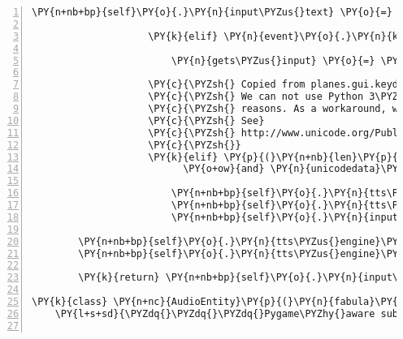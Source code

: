 \begin{Verbatim}[commandchars=\\\{\},numbers=left,firstnumber=1,stepnumber=1]
                        \PY{n+nb+bp}{self}\PY{o}{.}\PY{n}{input\PYZus{}text} \PY{o}{=} \PY{n+nb+bp}{self}\PY{o}{.}\PY{n}{input\PYZus{}text}\PY{p}{[}\PY{l+m+mi}{0}\PY{p}{:}\PY{o}{\PYZhy{}}\PY{l+m+mi}{1}\PY{p}{]}

                    \PY{k}{elif} \PY{n}{event}\PY{o}{.}\PY{n}{key} \PY{o+ow}{in} \PY{n}{ENTER\PYZus{}KEYS}\PY{p}{:}

                        \PY{n}{gets\PYZus{}input} \PY{o}{=} \PY{n+nb+bp}{False}

                    \PY{c}{\PYZsh{} Copied from planes.gui.keydown(self, keydown\PYZus{}event)}
                    \PY{c}{\PYZsh{} We can not use Python 3\PYZsq{}s str.isprintable() for Python 2 compatibility}
                    \PY{c}{\PYZsh{} reasons. As a workaround, we check the Unicode category of the input.}
                    \PY{c}{\PYZsh{} See}
                    \PY{c}{\PYZsh{} http://www.unicode.org/Public/5.1.0/ucd/UCD.html\PYZsh{}General\PYZus{}Category\PYZus{}Values}
                    \PY{c}{\PYZsh{}}
                    \PY{k}{elif} \PY{p}{(}\PY{n+nb}{len}\PY{p}{(}\PY{n}{event}\PY{o}{.}\PY{n}{unicode}\PY{p}{)}
                          \PY{o+ow}{and} \PY{n}{unicodedata}\PY{o}{.}\PY{n}{category}\PY{p}{(}\PY{n}{event}\PY{o}{.}\PY{n}{unicode}\PY{p}{)}\PY{p}{[}\PY{l+m+mi}{0}\PY{p}{]} \PY{o+ow}{in} \PY{l+s}{\PYZdq{}}\PY{l+s}{LNPSZ}\PY{l+s}{\PYZdq{}}\PY{p}{)}\PY{p}{:}

                        \PY{n+nb+bp}{self}\PY{o}{.}\PY{n}{tts\PYZus{}engine}\PY{o}{.}\PY{n}{say}\PY{p}{(}\PY{n}{event}\PY{o}{.}\PY{n}{unicode}\PY{p}{)}
                        \PY{n+nb+bp}{self}\PY{o}{.}\PY{n}{tts\PYZus{}engine}\PY{o}{.}\PY{n}{runAndWait}\PY{p}{(}\PY{p}{)}
                        \PY{n+nb+bp}{self}\PY{o}{.}\PY{n}{input\PYZus{}text} \PY{o}{=} \PY{n+nb+bp}{self}\PY{o}{.}\PY{n}{input\PYZus{}text} \PY{o}{+} \PY{n}{event}\PY{o}{.}\PY{n}{unicode}

        \PY{n+nb+bp}{self}\PY{o}{.}\PY{n}{tts\PYZus{}engine}\PY{o}{.}\PY{n}{say}\PY{p}{(}\PY{n+nb+bp}{self}\PY{o}{.}\PY{n}{input\PYZus{}text}\PY{p}{)}
        \PY{n+nb+bp}{self}\PY{o}{.}\PY{n}{tts\PYZus{}engine}\PY{o}{.}\PY{n}{runAndWait}\PY{p}{(}\PY{p}{)}

        \PY{k}{return} \PY{n+nb+bp}{self}\PY{o}{.}\PY{n}{input\PYZus{}text}

\PY{k}{class} \PY{n+nc}{AudioEntity}\PY{p}{(}\PY{n}{fabula}\PY{o}{.}\PY{n}{Entity}\PY{p}{)}\PY{p}{:}
    \PY{l+s+sd}{\PYZdq{}\PYZdq{}\PYZdq{}Pygame\PYZhy{}aware subclass of Entity to be used in AudioUserInterface.}


\end{Verbatim}
